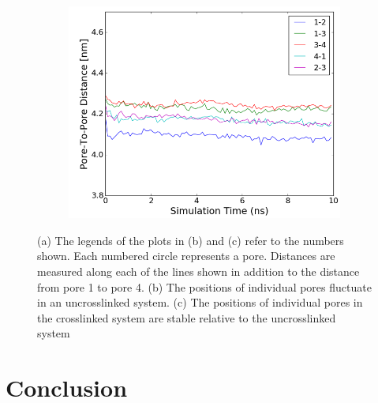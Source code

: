 \documentclass{article}
\begin{document}
\begin{figure}[!ht]
\begin{subfigure}{0.31\textwidth}
		\centering
		\includegraphics[width=\textwidth]{xlink_p2p.png}
		\caption{}\label{fig:xlink_p2p}
	\end{subfigure}
	\caption{(a) The legends of the plots in (b) and (c) refer to the numbers shown.
	Each numbered circle represents a pore. Distances are measured along each of the 
	lines shown in addition to the distance from pore 1 to pore 4. (b) The positions
	of individual pores fluctuate in an uncrosslinked system. (c) The positions of
	individual pores in the crosslinked system are stable relative to the uncrosslinked
	system}\label{fig:xlink}
  \end{figure}
  
  \section*{Conclusion}
  
\end{document}
